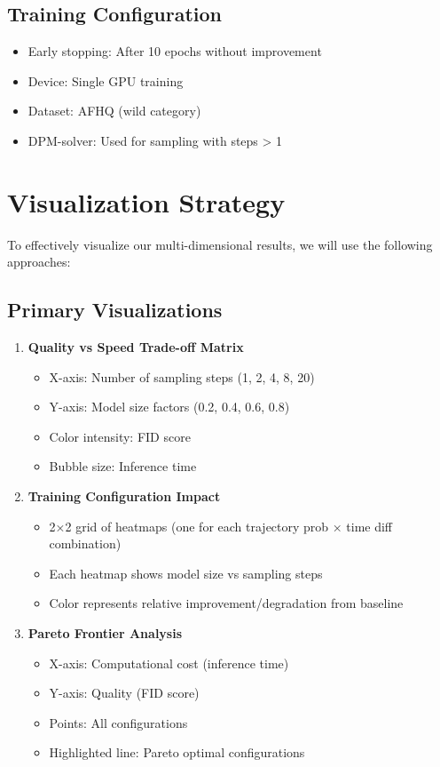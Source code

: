 \documentclass{article}
\begin{document}
\subsection{Training Configuration}
\begin{itemize}
    \item Early stopping: After 10 epochs without improvement
    \item Device: Single GPU training
    \item Dataset: AFHQ (wild category)
    \item DPM-solver: Used for sampling with steps > 1
\end{itemize}

\section{Visualization Strategy}
To effectively visualize our multi-dimensional results, we will use the following approaches:

\subsection{Primary Visualizations}
\begin{enumerate}
    \item \textbf{Quality vs Speed Trade-off Matrix}
    \begin{itemize}
        \item X-axis: Number of sampling steps (1, 2, 4, 8, 20)
        \item Y-axis: Model size factors (0.2, 0.4, 0.6, 0.8)
        \item Color intensity: FID score
        \item Bubble size: Inference time
    \end{itemize}

    \item \textbf{Training Configuration Impact}
    \begin{itemize}
        \item 2×2 grid of heatmaps (one for each trajectory prob × time diff combination)
        \item Each heatmap shows model size vs sampling steps
        \item Color represents relative improvement/degradation from baseline
    \end{itemize}

    \item \textbf{Pareto Frontier Analysis}
    \begin{itemize}
        \item X-axis: Computational cost (inference time)
        \item Y-axis: Quality (FID score)
        \item Points: All configurations
        \item Highlighted line: Pareto optimal configurations
    \end{itemize}
\end{enumerate}
\end{document}
